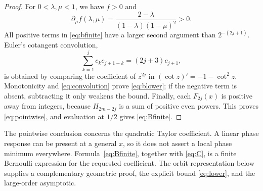 \documentclass[11pt,a4paper]{article}
\theoremstyle{remark}\newtheorem*{ednote}{Editorial note (ProveIt, 2026-10-01)}
\begin{document}
\begin{proof}
For $0<\lambda,\mu<1$, we have $f>0$ and
\[
 \partial_\mu f(\lambda,\mu)
   =\frac{2-\lambda}{(1-\lambda)(1-\mu)^2}>0.
\]
All positive terms in \eqref{eq:bfinite} have a larger second argument than $2^{-(2j+1)}$. Euler's cotangent convolution,
\begin{equation}\label{eq:convolution}
 \sum_{k=1}^j c_kc_{j+1-k}=(2j+3)c_{j+1},
\end{equation}
is obtained by comparing the coefficient of $z^{2j}$ in $(\cot z)'=-1-\cot^2z$. Monotonicity and \eqref{eq:convolution} prove \eqref{eq:blower}; if the negative term is absent, subtracting it only weakens the bound. Finally, each $F_{2j}(x)$ is positive away from integers, because $H_{2m-2j}$ is a sum of positive even powers. This proves \eqref{eq:pointwise}, and evaluation at $1/2$ gives \eqref{eq:Bfinite}.
\end{proof}
The pointwise conclusion concerns the quadratic Taylor coefficient. A linear phase response can be present at a general $x$, so it does not assert a local phase minimum everywhere. Formula~\eqref{eq:Bfinite}, together with \eqref{eq:C}, is a finite Bernoulli expression for the requested coefficient. The orbit representation below supplies a complementary geometric proof, the explicit bound \eqref{eq:lower}, and the large-order asymptotic.
\end{document}

